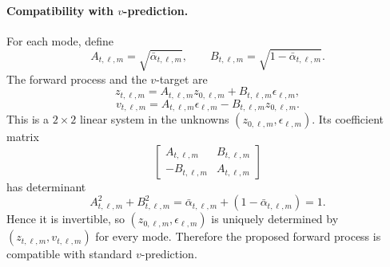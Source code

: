 \paragraph{Compatibility with $v$-prediction.}
For each mode, define
\[
A_{t,\ell,m}=\sqrt{\bar{\alpha}_{t,\ell,m}},
\qquad
B_{t,\ell,m}=\sqrt{1-\bar{\alpha}_{t,\ell,m}}.
\]
The forward process and the $v$-target are
\[
z_{t,\ell,m}=A_{t,\ell,m}z_{0,\ell,m}+B_{t,\ell,m}\epsilon_{\ell,m},
\]
\[
v_{t,\ell,m}=A_{t,\ell,m}\epsilon_{\ell,m}-B_{t,\ell,m}z_{0,\ell,m}.
\]
This is a $2\times2$ linear system in the unknowns $(z_{0,\ell,m},\epsilon_{\ell,m})$. Its coefficient matrix
\[
\begin{bmatrix}
A_{t,\ell,m} & B_{t,\ell,m}\\
-B_{t,\ell,m} & A_{t,\ell,m}
\end{bmatrix}
\]
has determinant
\[
A_{t,\ell,m}^2+B_{t,\ell,m}^2
=
\bar{\alpha}_{t,\ell,m} + (1-\bar{\alpha}_{t,\ell,m})
=
1.
\]
Hence it is invertible, so $(z_{0,\ell,m},\epsilon_{\ell,m})$ is uniquely determined by $(z_{t,\ell,m},v_{t,\ell,m})$ for every mode. Therefore the proposed forward process is compatible with standard $v$-prediction.

